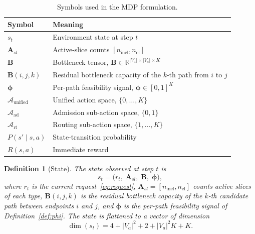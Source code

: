\documentclass[10pt,journal,comsoc]{IEEEtran}
\newtheorem{definition}{Definition}
\begin{document}
\begin{table}[t]
\centering
\caption{Symbols used in the MDP formulation.}
\label{tab:mdp_symbols}
\renewcommand{\arraystretch}{1.15}
\begin{tabular}{>{\raggedright\arraybackslash}p{1.4cm} >{\raggedright\arraybackslash}p{6.5cm}}
\toprule
\textbf{Symbol} & \textbf{Meaning} \\
\midrule
$s_t$ & Environment state at step $t$ \\
$\mathbf{A}_{sl}$ & Active-slice counts $[n_{\text{inel}}, n_{\text{el}}]$ \\
$\mathbf{B}$ & Bottleneck tensor, $\mathbf{B} \in \mathbb{R}^{|V_a|\times|V_a|\times K}$ \\
$\mathbf{B}(i,j,k)$ & Residual bottleneck capacity of the $k$-th path from $i$ to $j$ \\
$\boldsymbol{\phi}$ & Per-path feasibility signal, $\boldsymbol{\phi} \in [0,1]^{K}$ \\
$\mathcal{A}_{\text{unified}}$ & Unified action space, $\{0,\dots,K\}$ \\
$\mathcal{A}_{\text{ad}}$ & Admission sub-action space, $\{0,1\}$ \\
$\mathcal{A}_{\text{rt}}$ & Routing sub-action space, $\{1,\dots,K\}$ \\
$P(s'\mid s,a)$ & State-transition probability \\
$R(s,a)$ & Immediate reward \\
\bottomrule
\end{tabular}
\end{table}

\begin{definition}[State]
\label{def:state}
The state observed at step $t$ is
\begin{equation}
s_t = \bigl( r_t,\; \mathbf{A}_{sl},\; \mathbf{B},\; \boldsymbol{\phi} \bigr),
\label{eq:state}
\end{equation}
where $r_t$ is the current request~\eqref{eq:request},
$\mathbf{A}_{sl}=[n_{\text{inel}},n_{\text{el}}]$ counts active slices of
each type, $\mathbf{B}(i,j,k)$ is the residual bottleneck capacity of the
$k$-th candidate path between endpoints $i$ and $j$, and
$\boldsymbol{\phi}$ is the per-path feasibility signal of
Definition~\ref{def:phi}. The state is flattened to a vector of dimension
\begin{equation}
\dim(s_t) = 4 + |V_a|^2 + 2 + |V_a|^2 K + K .
\label{eq:statedim}
\end{equation}
\end{definition}
\end{document}
